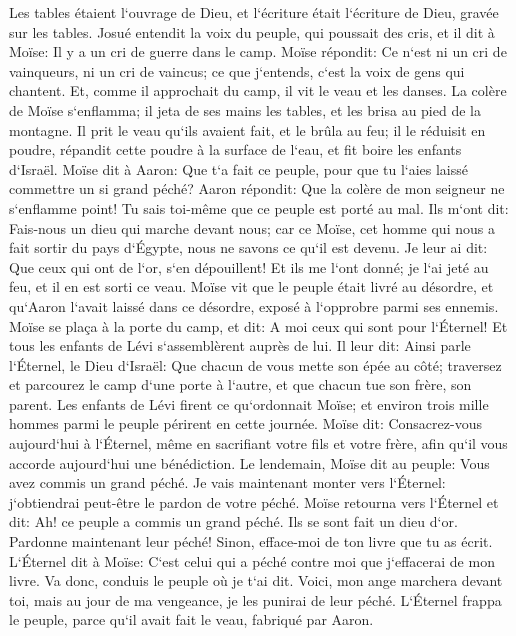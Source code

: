\verse Les tables étaient l`ouvrage de Dieu, et l`écriture était l`écriture de Dieu, gravée sur les tables. 
\verse Josué entendit la voix du peuple, qui poussait des cris, et il dit à Moïse: Il y a un cri de guerre dans le camp. 
\verse Moïse répondit: Ce n`est ni un cri de vainqueurs, ni un cri de vaincus; ce que j`entends, c`est la voix de gens qui chantent. 
\verse Et, comme il approchait du camp, il vit le veau et les danses. La colère de Moïse s`enflamma; il jeta de ses mains les tables, et les brisa au pied de la montagne. 
\verse Il prit le veau qu`ils avaient fait, et le brûla au feu; il le réduisit en poudre, répandit cette poudre à la surface de l`eau, et fit boire les enfants d`Israël. 
\verse Moïse dit à Aaron: Que t`a fait ce peuple, pour que tu l`aies laissé commettre un si grand péché? 
\verse Aaron répondit: Que la colère de mon seigneur ne s`enflamme point! Tu sais toi-même que ce peuple est porté au mal. 
\verse Ils m`ont dit: Fais-nous un dieu qui marche devant nous; car ce Moïse, cet homme qui nous a fait sortir du pays d`Égypte, nous ne savons ce qu`il est devenu. 
\verse Je leur ai dit: Que ceux qui ont de l`or, s`en dépouillent! Et ils me l`ont donné; je l`ai jeté au feu, et il en est sorti ce veau. 
\verse Moïse vit que le peuple était livré au désordre, et qu`Aaron l`avait laissé dans ce désordre, exposé à l`opprobre parmi ses ennemis. 
\verse Moïse se plaça à la porte du camp, et dit: A moi ceux qui sont pour l`Éternel! Et tous les enfants de Lévi s`assemblèrent auprès de lui. 
\verse Il leur dit: Ainsi parle l`Éternel, le Dieu d`Israël: Que chacun de vous mette son épée au côté; traversez et parcourez le camp d`une porte à l`autre, et que chacun tue son frère, son parent. 
\verse Les enfants de Lévi firent ce qu`ordonnait Moïse; et environ trois mille hommes parmi le peuple périrent en cette journée. 
\verse Moïse dit: Consacrez-vous aujourd`hui à l`Éternel, même en sacrifiant votre fils et votre frère, afin qu`il vous accorde aujourd`hui une bénédiction. 
\verse Le lendemain, Moïse dit au peuple: Vous avez commis un grand péché. Je vais maintenant monter vers l`Éternel: j`obtiendrai peut-être le pardon de votre péché. 
\verse Moïse retourna vers l`Éternel et dit: Ah! ce peuple a commis un grand péché. Ils se sont fait un dieu d`or. 
\verse Pardonne maintenant leur péché! Sinon, efface-moi de ton livre que tu as écrit. 
\verse L`Éternel dit à Moïse: C`est celui qui a péché contre moi que j`effacerai de mon livre. 
\verse Va donc, conduis le peuple où je t`ai dit. Voici, mon ange marchera devant toi, mais au jour de ma vengeance, je les punirai de leur péché. 
\verse L`Éternel frappa le peuple, parce qu`il avait fait le veau, fabriqué par Aaron. 

